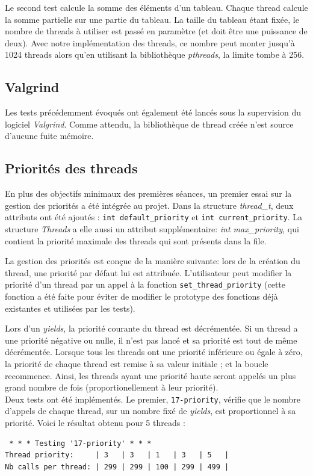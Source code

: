 \documentclass[a4paper,11pt]{article}
\begin{document}
Le second test calcule la somme des éléments d'un tableau. Chaque thread calcule  la somme partielle sur une partie du tableau. La taille du tableau étant fixée, le nombre de threads à utiliser est passé en paramètre (et doit être une puissance de deux). Avec notre implémentation des threads, ce nombre peut monter jusqu'à 1024 threads alors qu'en utilisant la bibliothèque \textit{pthreads}, la limite tombe à 256.

\subsection{Valgrind}

Les tests précédemment évoqués ont également été lancés sous la supervision du logiciel \textit{Valgrind}. Comme attendu, la bibliothèque de thread créée n'est source d'aucune fuite mémoire.

\subsection{Priorités des threads}

En plus des objectifs minimaux des premières séances, un premier essai sur la gestion des priorités a été intégrée au projet. Dans la structure \textit{thread\_t}, deux attributs ont été ajoutés : \texttt{int default\_priority} et \texttt{int current\_priority}. La structure \textit{Threads} a elle aussi un attribut supplémentaire: \textit{int max\_priority}, qui contient la priorité maximale des threads qui sont présents dans la file.

La gestion des priorités est conçue de la manière suivante: lors de la création du thread, une priorité par défaut lui est attribuée. L'utilisateur peut modifier la priorité d'un thread par un appel à la fonction \texttt{set\_thread\_priority} (cette fonction a été faite pour éviter de modifier le prototype des fonctions déjà existantes et utilisées par les tests).

Lors d'un \textit{yields}, la priorité courante du thread est décrémentée. Si un thread a une priorité négative ou nulle, il n'est pas lancé et sa priorité est tout de même décrémentée. Lorsque tous les threads ont une priorité inférieure ou égale à zéro, la priorité de chaque thread est remise à sa valeur initiale ; et la boucle recommence. Ainsi, les threads ayant une priorité haute seront appelés un plus grand nombre de fois (proportionellement à leur priorité).\\

Deux tests ont été implémentés. Le premier, \texttt{17-priority}, vérifie que le nombre d'appels de chaque thread, sur un nombre fixé de \textit{yields}, est proportionnel à sa priorité. Voici le résultat obtenu pour 5 threads :
\begin{verbatim}
 * * * Testing '17-priority' * * *
Thread priority:     | 3   | 3   | 1   | 3   | 5   |
Nb calls per thread: | 299 | 299 | 100 | 299 | 499 |
\end{verbatim}
\end{document}
